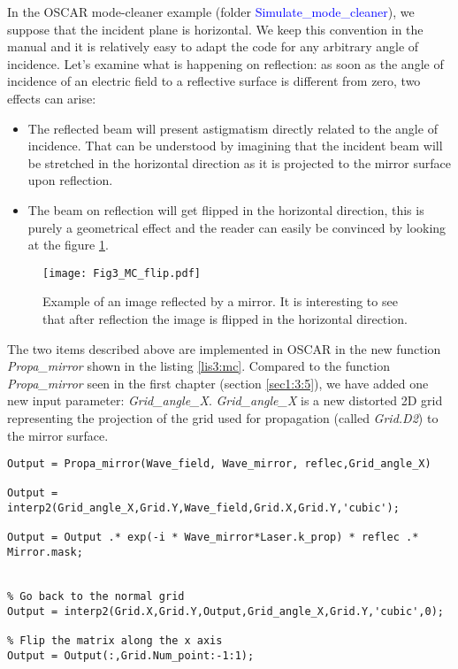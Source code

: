 In the OSCAR mode-cleaner example (folder \textcolor{blue}{Simulate\_mode\_cleaner}), we suppose that the incident plane is horizontal. We keep this convention in the manual and it is relatively easy to adapt the code for any arbitrary angle of incidence. Let's examine what is happening on reflection: as soon as the angle of incidence of an electric field to a reflective surface is different from zero, two effects can arise:
\begin{itemize}
  \item The reflected beam will present astigmatism directly related to the angle of incidence.
  That can be understood by imagining that the incident beam will be stretched in the horizontal direction as it is projected to the mirror surface upon reflection.
  \item The beam on reflection will get flipped in the horizontal direction, this is purely a geometrical effect and the reader can easily be convinced by looking at the figure \ref{fig3:MC_flip}.
\end{itemize}

\begin{figure}
\begin{center}
\texttt{[image: Fig3\_MC\_flip.pdf]}
\end{center}
\caption{Example of an image reflected by a mirror. It is interesting to see that after reflection the image is flipped in the horizontal direction. \label{fig3:MC_flip}}
\end{figure}

The two items described above are implemented in OSCAR in the new function \emph{Propa\_mirror} shown in the listing \ref{lis3:mc}. Compared to the function \emph{Propa\_mirror} seen in the first chapter (section \ref{sec1:3:5}), we have added one new input parameter: \textsl{Grid\_angle\_X}. \textsl{Grid\_angle\_X} is a new distorted 2D grid representing the projection of the grid used for propagation (called \textsl{Grid.D2}) to the mirror surface.

\begin{lstlisting}[float=btp,caption=Reflection on a mirror for arbitrary angle of incidence\label{lis3:mc},frame=lines]
% Stretch the laser beam as seen by the mirror
Output = Propa_mirror(Wave_field, Wave_mirror, reflec,Grid_angle_X)

Output = interp2(Grid_angle_X,Grid.Y,Wave_field,Grid.X,Grid.Y,'cubic');

Output = Output .* exp(-i * Wave_mirror*Laser.k_prop) * reflec .* Mirror.mask;


% Go back to the normal grid
Output = interp2(Grid.X,Grid.Y,Output,Grid_angle_X,Grid.Y,'cubic',0);

% Flip the matrix along the x axis
Output = Output(:,Grid.Num_point:-1:1);
\end{lstlisting}

